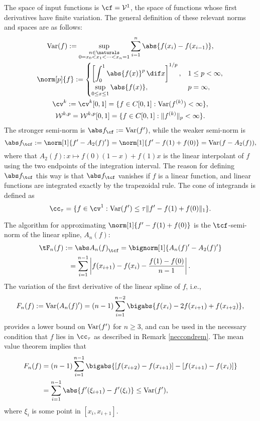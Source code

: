 The space of input functions is $\cf=\mathcal{V}^{1}$, the space of functions whose first derivatives have finite variation.  The general definition of these relevant norms and spaces are as follows:
\begin{subequations} \label{defSobolev}
\begin{gather} 
\Var(f) := \sup_{\substack{n \in \naturals\\ 0 = x_0 < x_1 < \cdots < x_{n} =1}} \sum_{i=1}^n \abs{f(x_i)-f(x_{i-1})}, \\
\norm[p]{f}:= \begin{cases} \displaystyle \left[\int_0^1 \abs{f(x)}^p \, \dif x \right]^{1/p}, & 1 \le p < \infty,\\[1ex]
\displaystyle  \sup_{0 \le x \le 1} \abs{f(x)}, & p=\infty,
\end{cases}
\\
\cv^{k}: =\cv^{k}[0,1]=\{f\in C[0,1]: \Var(f^{(k)}) < \infty \}, \\
\mathcal{W}^{k,p}=\mathcal{W}^{k,p}[0,1]=\{f\in C[0,1]: \|f^{(k)}\|_{p}<\infty\}.
\end{gather}
\end{subequations}
The stronger semi-norm is $\Fnorm{f}:=\Var(f')$, while the weaker semi-norm is 
\[
\Ftnorm{f}:=\norm[1]{f'-A_2(f)'}=\norm[1]{f'-f(1)+f(0)}=\Var(f-A_2(f)),
\]  
where that $A_2(f): x \mapsto f(0)(1-x)+f(1)x$ is the linear interpolant of $f$ using the two endpoints of the integration interval. The reason for defining $\Ftnorm{f}$ this way is that $\Ftnorm{f}$ vanishes if $f$ is a linear function, and linear functions are integrated exactly by the trapezoidal rule.  The cone of integrands is defined as  
\begin{equation}\label{coneinteg}
\cc_{\tau}=\{f\in \cv^{1}:\Var(f')\leq\tau\|f'-f(1)+f(0)\|_1\}.
\end{equation}

The algorithm for approximating $\norm[1]{f'-f(1)+f(0)}$ is the $\tcf$-semi-norm of the linear spline, $A_n(f)$:
\begin{multline}\label{1direst}
    \tF_n(f):=\Ftnorm{A_n(f)}=\bignorm[1]{A_n(f)'-A_2(f)'} \\
    =\sum_{i=1}^{n-1}\left|f(x_{i+1})-f(x_{i}) - \frac{f(1)-f(0)}{n-1}\right|.
\end{multline} 
The variation of the first derivative of the linear spline of $f$, i.e., 
\begin{equation} \label{Fnormalg}
F_n(f) :=\Var(A_n(f)') = (n-1)\sum_{i=1}^{n-2} \bigabs{f(x_i) - 2 f(x_{i+1})+f(x_{i+2})},
\end{equation}
provides a lower bound on $\operatorname{Var}(f')$ for $n \ge 3$, and can be used in the necessary condition that $f$ lies in $\cc_\tau$ as described in Remark \ref{neccondrem}. 
The mean value theorem implies that 
\begin{align*}
F_n(f) &= (n-1)\sum_{i=1}^{n-1} \bigabs{[f(x_{i+2}) - f(x_{i+1})] - [f(x_{i+1}) - f(x_{i})]} \\
&= \sum_{i=1}^{n-1} \abs{f'(\xi_{i+1}) - f'(\xi_{i})} \le \Var(f'),
\end{align*}
where $\xi_i$ is some point in $[x_i,x_{i+1}]$.


